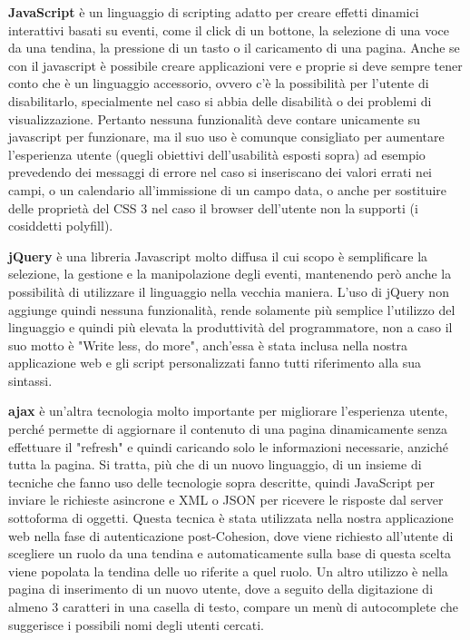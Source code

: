 \textbf{JavaScript} \cite{javascript} è un linguaggio di scripting adatto per creare effetti dinamici interattivi basati su eventi, come il click di un bottone, la selezione di una voce da una tendina, la pressione di un tasto o il caricamento di una pagina.
Anche se con il javascript è possibile creare applicazioni vere e proprie si deve sempre tener conto che è un linguaggio accessorio, ovvero c'è la possibilità per l'utente di disabilitarlo, specialmente nel caso si abbia delle disabilità o dei problemi di visualizzazione.
Pertanto nessuna funzionalità deve contare unicamente su javascript per funzionare, ma il suo uso è comunque consigliato per aumentare l'esperienza utente (quegli obiettivi dell'usabilità esposti sopra) ad esempio prevedendo dei messaggi di errore nel caso si inseriscano dei valori errati nei campi, o un calendario all'immissione di un campo data, o anche per sostituire delle proprietà del CSS 3 nel caso il browser dell'utente non la supporti (i cosiddetti polyfill).

\textbf{jQuery} \cite{jquery} è una libreria Javascript molto diffusa il cui scopo è semplificare la selezione, la gestione e la manipolazione degli eventi, mantenendo però anche la possibilità di utilizzare il linguaggio nella vecchia maniera.
L'uso di jQuery non aggiunge quindi nessuna funzionalità, rende solamente più semplice l'utilizzo del linguaggio e quindi più elevata la produttività del programmatore, non a caso il suo motto è "Write less, do more", anch'essa è stata inclusa nella nostra applicazione web e gli script personalizzati fanno tutti riferimento alla sua sintassi.

\textbf{\Gls{ajax}} è un'altra tecnologia molto importante per migliorare l'esperienza utente, perché permette di aggiornare il contenuto di una pagina dinamicamente senza effettuare il "refresh" e quindi caricando solo le informazioni necessarie, anziché tutta la pagina.
Si tratta, più che di un nuovo linguaggio, di un insieme di tecniche che fanno uso delle tecnologie sopra descritte, quindi JavaScript per inviare le richieste asincrone e XML o JSON per ricevere le risposte dal server sottoforma di oggetti.
Questa tecnica è stata utilizzata nella nostra applicazione web nella fase di autenticazione post-Cohesion, dove viene richiesto all'utente di scegliere un ruolo da una tendina e automaticamente sulla base di questa scelta viene popolata la tendina delle \Gls{uo} riferite a quel ruolo.
Un altro utilizzo è nella pagina di inserimento di un nuovo utente, dove a seguito della digitazione di almeno 3 caratteri in una casella di testo, compare un menù di autocomplete che suggerisce i possibili nomi degli utenti cercati.

